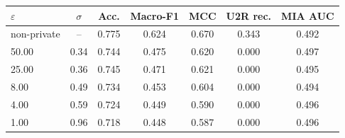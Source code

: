 \begin{tabular}{lcccccc}
\toprule
$\varepsilon$ & $\sigma$ & Acc. & Macro-F1 & MCC & U2R rec. & MIA AUC \\
\midrule
non-private & -- & 0.775 & 0.624 & 0.670 & 0.343 & 0.492 \\
50.00 & 0.34 & 0.744 & 0.475 & 0.620 & 0.000 & 0.497 \\
25.00 & 0.36 & 0.745 & 0.471 & 0.621 & 0.000 & 0.495 \\
8.00 & 0.49 & 0.734 & 0.453 & 0.604 & 0.000 & 0.494 \\
4.00 & 0.59 & 0.724 & 0.449 & 0.590 & 0.000 & 0.496 \\
1.00 & 0.96 & 0.718 & 0.448 & 0.587 & 0.000 & 0.496 \\
\bottomrule
\end{tabular}
